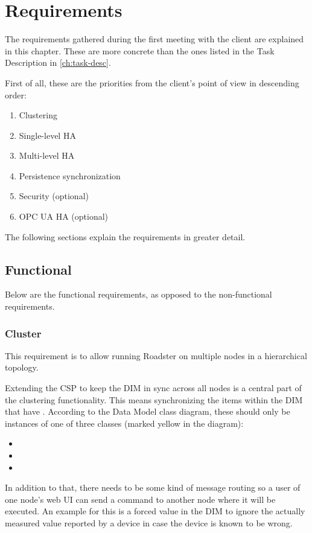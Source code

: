 \chapter{Requirements}
The requirements gathered during the first meeting with the client are
explained in this chapter. These are more concrete than the ones listed in the
Task Description in \autoref{ch:task-desc}.

First of all, these are the priorities from the client's point of view in
descending order:

\begin{enumerate}
\item Clustering
\item Single-level \gls{HA}
\item Multi-level \gls{HA}
\item Persistence synchronization
\item Security (optional)
\item OPC UA \gls{HA} (optional)
\end{enumerate}

The following sections explain the requirements in greater detail.

\section{Functional}
Below are the functional requirements, as opposed to the non-functional
requirements.


\subsection{Cluster}
This requirement is to allow running Roadster on multiple nodes in a
hierarchical topology.

Extending the \gls{CSP} to keep the DIM in sync across all nodes is a central
part of the clustering functionality. This means synchronizing the
items within the DIM that have . According to
the Data Model class diagram, these should only be instances of one of three
classes (marked yellow in the diagram):
\begin{itemize}
	\item {}
	\item {}
	\item {}
\end{itemize}

In addition to that, there needs to be some kind of message routing so a user
of one node's web UI can send a command to another node where it will be
executed. An example for this is a forced value in the DIM to ignore the
actually measured value reported by a device in case the device is known to be
wrong.


